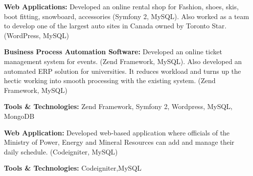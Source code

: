 \documentclass[letterpaper]{deedy-resume} %
\begin{document}
\begin{minipage}[t]{0.66\textwidth}
\begin{tightitemize}
\item \textbf{Web Applications:}
Developed an online rental shop for Fashion, shoes, skis, boot fitting, snowboard, accessories (Symfony 2, MySQL). Also worked as a team to develop one of the largest auto sites in Canada owned by Toronto Star. (WordPress, MySQL)

\item \textbf{Business Process Automation Software:}
Developed an online ticket management system for events. (Zend Framework, MySQL). Also developed an automated ERP solution for universities. It reduces workload and turns up the hectic working into smooth processing with the existing system. (Zend Framework, MySQL)

\item \textbf{Tools & Technologies:} Zend Framework, Symfony 2, Wordpress, MySQL, MongoDB
\end{tightitemize}
\sectionspace %


\begin{tightitemize}
\sectionspace
\item \textbf{Web Application:}
Developed web-based application where officials of the Ministry of Power, Energy and Mineral Resources can add and manage their daily schedule. (Codeigniter, MySQL)
\item \textbf{Tools & Technologies:} Codeigniter,MySQL
\end{tightitemize}


\sectionspace %
\end{minipage} %
\end{document}
